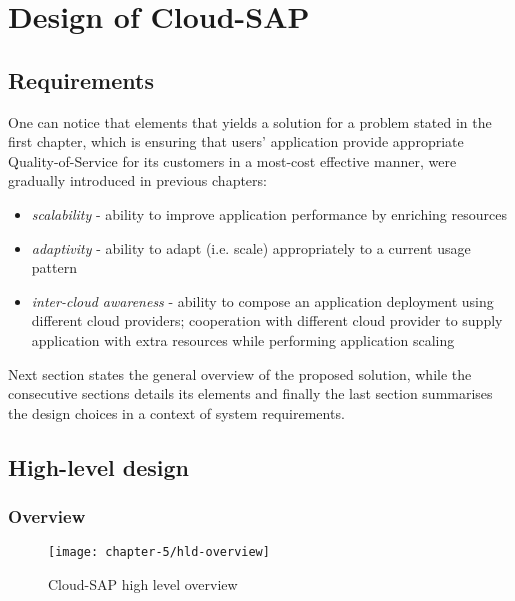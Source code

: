 \chapter{Design of Cloud-SAP}


\section{Requirements}
One can notice that elements that yields a solution for a problem stated in the first chapter, which is ensuring that users' application provide appropriate Quality-of-Service for its customers in a most-cost effective manner, were gradually introduced in previous chapters:

\begin{itemize}
	\item \emph{scalability} - ability to improve application performance by enriching resources
	\item \emph{adaptivity} - ability to adapt (i.e. scale) appropriately to a current usage pattern
	\item \emph{inter-cloud awareness} - ability to compose an application deployment using different cloud providers; cooperation with different cloud provider to supply application with extra resources while performing application scaling
\end{itemize}

Next section states the general overview of the proposed solution, while the consecutive sections details its elements and finally the last section summarises the design choices in a context of system requirements.
	
\section{High-level design}
\subsection{Overview}

\begin{figure}[!ht]
  \begin{center}
    \texttt{[image: chapter-5/hld-overview]}
  \end{center}
  \caption{Cloud-SAP high level overview}
  \label{design:hld-overview}
\end{figure}

